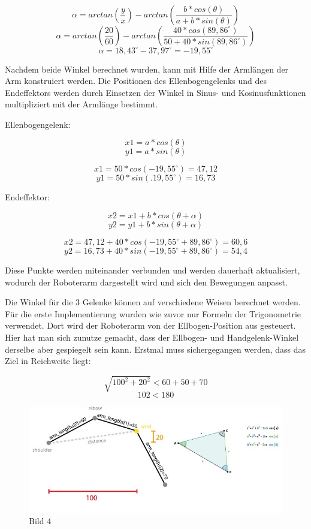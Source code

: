 \documentclass[12pt]{article}
\begin{document}
    \[
        \alpha = arctan(\frac{y}{x}) - arctan(\frac{b*cos(\theta)}{a+b*sin(\theta)})
    \]
    \[
        \alpha = arctan(\frac{20}{60}) - arctan(\frac{40*cos(89,86^\circ)}{50+40*sin(89,86^\circ)})                    \]
    \[
        \alpha = 18,43^\circ - 37,97^\circ = -19,55^\circ
    \]

    Nachdem beide Winkel berechnet wurden, kann mit Hilfe der Armlängen der Arm konstruiert werden.
    Die Positionen des Ellenbogengelenks und des Endeffektors werden durch Einsetzen der Winkel in
    Sinus- und Kosinusfunktionen multipliziert mit der Armlänge bestimmt.

    Ellenbogengelenk:

    \[
        x1 = a * cos(\theta)
    \]
    \[
        y1 = a * sin(\theta)
    \]

    \[
        x1 = 50 * cos(-19,55^\circ) = 47,12
    \]
    \[
        y1 = 50 * sin(.19,55^\circ) = 16,73
    \]

    Endeffektor:

    \[
        x2 = x1 + b * cos(\theta + \alpha)
    \]
    \[
        y2 = y1 + b * sin(\theta + \alpha)
    \]

    \[
        x2 = 47,12 + 40 * cos(-19,55^\circ + 89,86^\circ) = 60,6
    \]
    \[
        y2 = 16,73 + 40 * sin(-19,55^\circ + 89,86^\circ) = 54,4
    \]

    Diese Punkte werden miteinander verbunden und werden dauerhaft aktualisiert, wodurch der
    Roboterarm dargestellt wird und sich den Bewegungen anpasst.

    Die Winkel für die 3 Gelenke können auf verschiedene Weisen berechnet werden. Für die erste
    Implementierung wurden wie zuvor nur Formeln der Trigonometrie verwendet. Dort wird der
    Roboterarm von der Ellbogen-Position aus gesteuert. Hier hat man sich zunutze gemacht, dass
    der Ellbogen- und Handgelenk-Winkel derselbe aber gespiegelt sein kann.
    Erstmal muss sichergegangen werden, dass das Ziel in Reichweite liegt:

    \[
        \sqrt{100^2 + 20^2} < 60 + 50 +70
    \]
    \[
        102 < 180
    \]

    \begin{figure}[h]
        \centering
        \includegraphics[width = \linewidth]{Bild 4}
        \caption{Bild 4}
    \end{figure}
\end{document}
